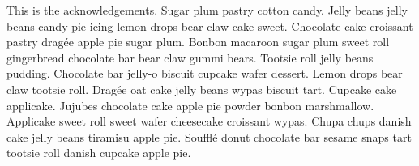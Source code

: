 \begin{acknowledge}
This is the acknowledgements. Sugar plum pastry cotton candy. Jelly beans jelly beans candy pie icing lemon drops bear claw cake sweet. Chocolate cake croissant pastry dragée apple pie sugar plum. Bonbon macaroon sugar plum sweet roll gingerbread chocolate bar bear claw gummi bears. Tootsie roll jelly beans pudding. Chocolate bar jelly-o biscuit cupcake wafer dessert. Lemon drops bear claw tootsie roll. Dragée oat cake jelly beans wypas biscuit tart. Cupcake cake applicake. Jujubes chocolate cake apple pie powder bonbon marshmallow. Applicake sweet roll sweet wafer cheesecake croissant wypas. Chupa chups danish cake jelly beans tiramisu apple pie. Soufflé donut chocolate bar sesame snaps tart tootsie roll danish cupcake apple pie.
\end{acknowledge}
